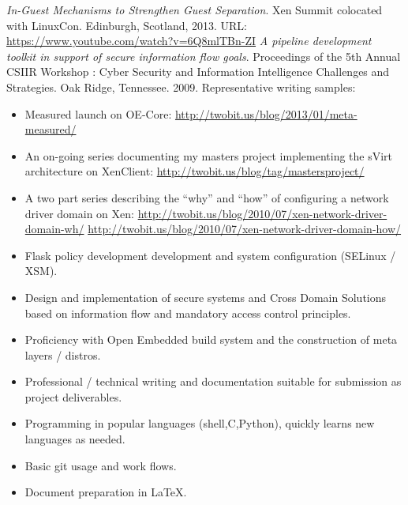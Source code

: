 \documentclass[letterpaper,11pt]{article}
\begin{document}
    {\it In-Guest Mechanisms to Strengthen Guest Separation}.
    Xen Summit colocated with LinuxCon.
    Edinburgh, Scotland,
    2013.
    URL: \url {https://www.youtube.com/watch?v=6Q8mlTBn-ZI}\newline\newline
    {\it A pipeline development toolkit in support of secure information flow goals}.
    Proceedings of the 5th Annual CSIIR Workshop : Cyber Security and Information Intelligence Challenges and Strategies.
    Oak Ridge, Tennessee.
    2009.\newline\newline
    Representative writing samples:
    \begin {itemize}
      \setlength {\itemsep}{1pt}
      \setlength {\parskip}{0pt}
      \setlength {\parsep}{0pt}
    \item
      Measured launch on OE-Core:
      \url {http://twobit.us/blog/2013/01/meta-measured/}
    \item
      An on-going series documenting my masters project implementing the sVirt architecture on XenClient:
      \url {http://twobit.us/blog/tag/mastersproject/}
    \item
      A two part series describing the ``why'' and ``how'' of configuring a network driver domain on Xen:
      \url {http://twobit.us/blog/2010/07/xen-network-driver-domain-wh/}
      \url {http://twobit.us/blog/2010/07/xen-network-driver-domain-how/}
    \end {itemize}

    \begin {itemize}
      \setlength {\itemsep}{1pt}
      \setlength {\parskip}{0pt}
      \setlength {\parsep}{0pt}
      \item Flask policy development development and system configuration (SELinux / XSM).
      \item Design and implementation of secure systems and Cross Domain Solutions based on information flow and mandatory access control principles.
      \item Proficiency with Open Embedded build system and the construction of meta layers / distros.
      \item Professional / technical writing and documentation suitable for submission as project deliverables.
      \item Programming in popular languages (shell,C,Python), quickly learns new languages as needed.
      \item Basic git usage and work flows.
      \item Document preparation in \LaTeX.
    \end {itemize}
\end{document}
